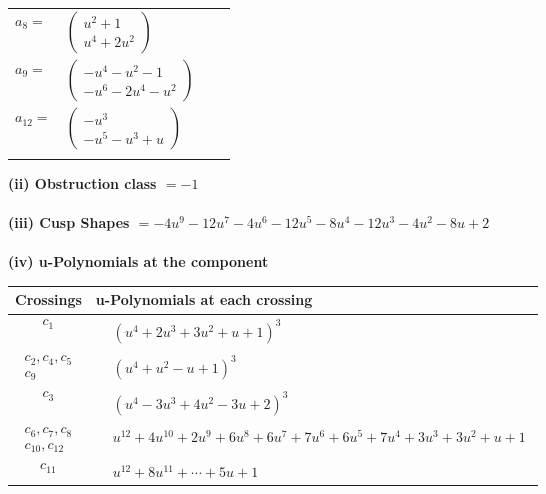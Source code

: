 \documentclass[1p]{elsarticle_modified}
\theoremstyle{definition}
\begin{document}
\begin{tabular}{m{7pt} m{180pt} m{7pt} m{180pt} }
\flushright $a_{8}=$&$\begin{pmatrix}u^2+1\\u^4+2 u^2\end{pmatrix}$ \\
\flushright $a_{9}=$&$\begin{pmatrix}- u^4- u^2-1\\- u^6-2 u^4- u^2\end{pmatrix}$ \\
\flushright $a_{12}=$&$\begin{pmatrix}- u^3\\- u^5- u^3+u\end{pmatrix}$\\&\end{tabular}
\flushleft \textbf{(ii) Obstruction class $= -1$}\\~\\
\flushleft \textbf{(iii) Cusp Shapes $= -4 u^9-12 u^7-4 u^6-12 u^5-8 u^4-12 u^3-4 u^2-8 u+2$}\\~\\
\newpage\renewcommand{\arraystretch}{1}
\flushleft \textbf{(iv) u-Polynomials at the component}\newline \\
\begin{tabular}{m{50pt}|m{274pt}}
Crossings & \hspace{64pt}u-Polynomials at each crossing \\
\hline $$\begin{aligned}c_{1}\end{aligned}$$&$\begin{aligned}
&(u^4+2 u^3+3 u^2+u+1)^3
\end{aligned}$\\
\hline $$\begin{aligned}c_{2},c_{4},c_{5}\\c_{9}\end{aligned}$$&$\begin{aligned}
&(u^4+u^2- u+1)^3
\end{aligned}$\\
\hline $$\begin{aligned}c_{3}\end{aligned}$$&$\begin{aligned}
&(u^4-3 u^3+4 u^2-3 u+2)^3
\end{aligned}$\\
\hline $$\begin{aligned}c_{6},c_{7},c_{8}\\c_{10},c_{12}\end{aligned}$$&$\begin{aligned}
&u^{12}+4 u^{10}+2 u^9+6 u^8+6 u^7+7 u^6+6 u^5+7 u^4+3 u^3+3 u^2+u+1
\end{aligned}$\\
\hline $$\begin{aligned}c_{11}\end{aligned}$$&$\begin{aligned}
&u^{12}+8 u^{11}+\cdots+5 u+1
\end{aligned}$\\
\hline
\end{tabular}\\~\\
\end{document}
